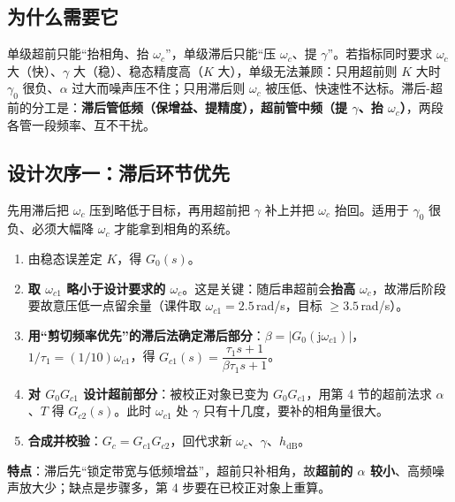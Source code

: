 \subsection{为什么需要它}
单级超前只能“抬相角、抬 $\omega_c$”，单级滞后只能“压 $\omega_c$、提 $\gamma$”。若指标同时要求 $\omega_c$ 大（快）、$\gamma$ 大（稳）、稳态精度高（$K$ 大），单级无法兼顾：只用超前则 $K$ 大时 $\gamma_0$ 很负、$\alpha$ 过大而噪声压不住；只用滞后则 $\omega_c$ 被压低、快速性不达标。滞后-超前的分工是：\textbf{滞后管低频（保增益、提精度），超前管中频（提 $\gamma$、抬 $\omega_c$）}，两段各管一段频率、互不干扰。

\subsection{设计次序一：滞后环节优先}
先用滞后把 $\omega_c$ 压到略低于目标，再用超前把 $\gamma$ 补上并把 $\omega_c$ 抬回。适用于 $\gamma_0$ 很负、必须大幅降 $\omega_c$ 才能拿到相角的系统。
\begin{enumerate}
    \item 由稳态误差定 $K$，得 $G_0(s)$。
    \item \textbf{取 $\omega_{c1}$ 略小于设计要求的 $\omega_c$}。这是关键：随后串超前会\textbf{抬高} $\omega_c$，故滞后阶段要故意压低一点留余量（课件取 $\omega_{c1}=2.5$\,rad/s，目标 $\ge3.5$\,rad/s）。
    \item \textbf{用“剪切频率优先”的滞后法确定滞后部分}：$\beta=|G_0(\mathrm{j}\omega_{c1})|$，$1/\tau_1=(1/10)\omega_{c1}$，得 $G_{c1}(s)=\dfrac{\tau_1s+1}{\beta\tau_1s+1}$。
    \item \textbf{对 $G_0G_{c1}$ 设计超前部分}：被校正对象已变为 $G_0G_{c1}$，用第 4 节的超前法求 $\alpha$、$T$ 得 $G_{c2}(s)$。此时 $\omega_{c1}$ 处 $\gamma$ 只有十几度，要补的相角量很大。
    \item \textbf{合成并校验}：$G_c=G_{c1}G_{c2}$，回代求新 $\omega_c$、$\gamma$、$h_{\mathrm{dB}}$。
\end{enumerate}
\textbf{特点}：滞后先“锁定带宽与低频增益”，超前只补相角，故\textbf{超前的 $\alpha$ 较小}、高频噪声放大少；缺点是步骤多，第 4 步要在已校正对象上重算。

